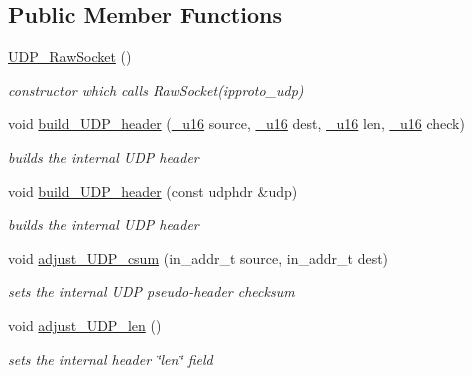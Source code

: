 \subsection*{Public Member Functions}
\begin{CompactItemize}
\item 
\hyperlink{classsocketpp_1_1UDP__RawSocket_508aba470eee4010ca16007823c91650}{UDP\_\-RawSocket} ()
\begin{CompactList}\small\item\em constructor which calls RawSocket(ipproto\_\-udp) \item\end{CompactList}\item 
void \hyperlink{classsocketpp_1_1UDP__RawSocket_f107901141295d21929008e281aac00f}{build\_\-UDP\_\-header} (\hyperlink{namespacesocketpp_0d48e817f00cbb84d07faec41ee4b169}{\_\-u16} source, \hyperlink{namespacesocketpp_0d48e817f00cbb84d07faec41ee4b169}{\_\-u16} dest, \hyperlink{namespacesocketpp_0d48e817f00cbb84d07faec41ee4b169}{\_\-u16} len, \hyperlink{namespacesocketpp_0d48e817f00cbb84d07faec41ee4b169}{\_\-u16} check)
\begin{CompactList}\small\item\em builds the internal UDP header \item\end{CompactList}\item 
void \hyperlink{classsocketpp_1_1UDP__RawSocket_b194e3ab2f5b758dee8a0c715d895c1e}{build\_\-UDP\_\-header} (const udphdr \&udp)
\begin{CompactList}\small\item\em builds the internal UDP header \item\end{CompactList}\item 
void \hyperlink{classsocketpp_1_1UDP__RawSocket_8d96a58ee9d39e2c014aa81ded23727a}{adjust\_\-UDP\_\-csum} (in\_\-addr\_\-t source, in\_\-addr\_\-t dest)
\begin{CompactList}\small\item\em sets the internal UDP pseudo-header checksum \item\end{CompactList}\item 
void \hyperlink{classsocketpp_1_1UDP__RawSocket_1caa413cfe4f72d8c0aeccdcb10469b5}{adjust\_\-UDP\_\-len} ()
\begin{CompactList}\small\item\em sets the internal header \char`\"{}len\char`\"{} field \item\end{CompactList}\item 

\end{CompactItemize}
